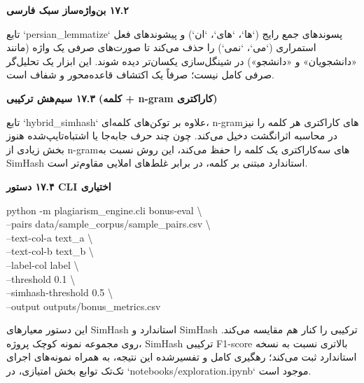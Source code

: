 \documentclass[11pt]{article}
\begin{document}
\smallskip
{\bfseries ‏۱۷.۲ بن‌واژه‌ساز سبک فارسی}\smallskip


\noindent ‏تابع `persian\_lemmatize` پسوندهای جمع رایج (`ها`، `های`، `ان`) و پیشوندهای فعل استمراری (`می‌`، `نمی‌`) را حذف می‌کند تا صورت‌های صرفی یک واژه (مانند «دانشجویان» و «دانشجو») در شینگل‌سازی یکسان‌تر دیده شوند. این ابزار یک تحلیل‌گر صرفی کامل نیست؛ صرفاً یک اکتشاف قاعده‌محور و شفاف است.\par

\smallskip
{\bfseries ‏۱۷.۳ سیم‌هش ترکیبی (کلمه + n-gram کاراکتری)}\smallskip


\noindent ‏تابع `hybrid\_simhash` علاوه بر توکن‌های کلمه‌ای، n-gramهای کاراکتری هر کلمه را نیز در محاسبه اثرانگشت دخیل می‌کند. چون چند حرف جابه‌جا یا اشتباه‌تایپ‌شده هنوز بخش زیادی از n-gramهای سه‌کاراکتری یک کلمه را حفظ می‌کند، این روش نسبت به SimHash استاندارد مبتنی بر کلمه، در برابر غلط‌های املایی مقاوم‌تر است.\par

\smallskip
{\bfseries ‏۱۷.۴ دستور CLI اختیاری}\smallskip


{\mycode
\begin{flushleft}
python -m plagiarism\_engine.cli bonus-eval \textbackslash{} \\
\hspace*{1.10em}--pairs data/sample\_corpus/sample\_pairs.csv \textbackslash{} \\
\hspace*{1.10em}--text-col-a text\_a \textbackslash{} \\
\hspace*{1.10em}--text-col-b text\_b \textbackslash{} \\
\hspace*{1.10em}--label-col label \textbackslash{} \\
\hspace*{1.10em}--threshold 0.1 \textbackslash{} \\
\hspace*{1.10em}--simhash-threshold 0.5 \textbackslash{} \\
\hspace*{1.10em}--output outputs/bonus\_metrics.csv
\end{flushleft}}

\noindent ‏این دستور معیارهای SimHash استاندارد و SimHash ترکیبی را کنار هم مقایسه می‌کند. روی مجموعه نمونه کوچک پروژه، SimHash ترکیبی F1-score بالاتری نسبت به نسخه استاندارد ثبت می‌کند؛ رهگیری کامل و تفسیرشده این نتیجه، به همراه نمونه‌های اجرای تک‌تک توابع بخش امتیازی، در `notebooks/exploration.ipynb` موجود است.\par
\end{document}
